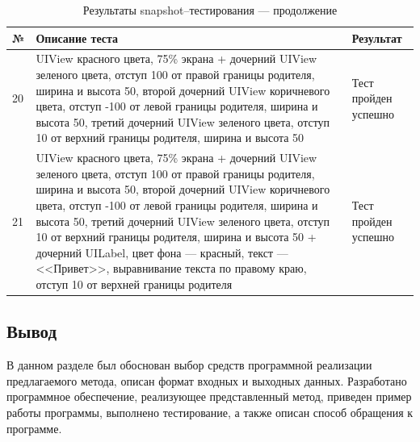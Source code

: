 \begin{table}[!htb]
 \label{table:tests4}
 \begin{center}
  \caption{Результаты snapshot--тестирования --- продолжение}
 \begin{tabular}{|p{0.6cm}|p{10cm}|p{5cm}|}
  \hline
   \bfseries № & \bfseries Описание теста & \bfseries Результат \\ \hline
   20 & UIView красного цвета, 75\% экрана + дочерний UIView зеленого цвета, отступ 100 от правой границы родителя, ширина и высота 50, второй дочерний UIView коричневого цвета, отступ -100 от левой границы родителя, ширина и высота 50, третий дочерний UIView зеленого цвета, отступ 10 от верхний границы родителя, ширина и высота 50 & Тест пройден успешно  \\ \hline
   21 & UIView красного цвета, 75\% экрана + дочерний UIView зеленого цвета, отступ 100 от правой границы родителя, ширина и высота 50, второй дочерний UIView коричневого цвета, отступ -100 от левой границы родителя, ширина и высота 50, третий дочерний UIView зеленого цвета, отступ 10 от верхний границы родителя, ширина и высота 50 + дочерний UILabel, цвет фона --- красный, текст --- <<Привет>>, выравнивание текста по правому краю, отступ 10 от верхней границы родителя & Тест пройден успешно  \\ \hline  \end{tabular}
 \end{center}
\end{table}

\subsection*{Вывод}

В данном разделе был обоснован выбор средств программной реализации предлагаемого метода, описан формат входных и выходных данных. 
Разработано программное обеспечение, реализующее представленный метод, приведен пример работы программы, выполнено тестирование, а также описан способ обращения к программе.

\pagebreak